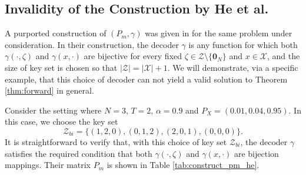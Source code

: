 \documentclass[11pt,letterpaper]{article}
\newcommand{\cX}{\mathcal{X}}
\newcommand{\cZ}{\mathcal{Z}}
\begin{document}
\subsection{Invalidity of the Construction by He et al.}
A purported construction of $(P_m,\gamma)$ was given in \cite{hedistributional} for the same problem under consideration. In their construction, the decoder $\gamma$ is any function for which both $\gamma(\cdot, \zeta)$ and $\gamma(x, \cdot)$ are bijective for every fixed $\zeta \in \cZ \setminus \{\mathbf{0}_N \}$ and $x \in \cX$, and the size of key set is chosen so that  $|\cZ| = |\cX|+1$. We will demonstrate, via a specific example, that this choice of decoder can not yield a valid solution to Theorem \ref{thm:forward} in general.

Consider the setting where $N=3$, $T=2$, $\alpha = 0.9$ and $P_X=(0.01,0.04,0.95)$. In this case, we choose the key set
$$\cZ_{bi} = \{(1,2,0),(0,1,2),(2,0,1),(0,0,0)\}.$$
It is straightforward to verify that, with this choice of key set $\cZ_{bi}$, the decoder $\gamma$ satisfies the required condition that both $\gamma(\cdot, \zeta)$ and $\gamma(x, \cdot)$ are bijection mappings. Their matrix $P_m$ is shown in Table \ref{tab:construct_pm_he}. 
\end{document}
